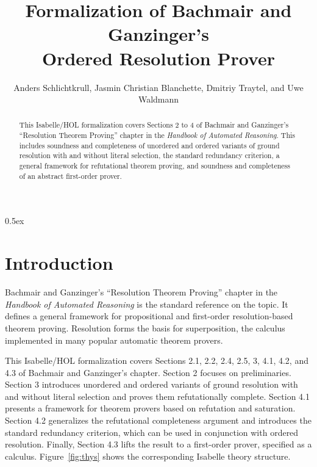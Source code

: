\documentclass[10pt,a4paper]{article}
\begin{document}
\title{Formalization of Bachmair and Ganzinger's \\ Ordered Resolution Prover}
\author{Anders Schlichtkrull, Jasmin Christian Blanchette, Dmitriy Traytel, and Uwe Waldmann}

\maketitle

\begin{abstract}
\noindent
This Isabelle/HOL formalization covers Sections 2 to 4 of Bachmair and
Ganzinger's ``Resolution Theorem Proving'' chapter in the \emph{Handbook of
Automated Reasoning}. This includes soundness and completeness of unordered
and ordered variants of ground resolution with and without literal selection,
the standard redundancy criterion, a general framework for refutational
theorem proving, and soundness and completeness of an abstract first-order
prover.
\end{abstract}

\tableofcontents

\parindent 0pt
\parskip 0.5ex

\section{Introduction}

Bachmair and Ganzinger's ``Resolution Theorem Proving'' chapter
in the \emph{Handbook of Automated Reasoning} is the standard reference on the
topic. It defines a general framework for propositional and first-order
resolution-based theorem proving. Resolution forms the basis for
superposition, the calculus implemented in many popular automatic theorem
provers.

\medskip

This Isabelle/HOL formalization covers Sections 2.1, 2.2, 2.4, 2.5, 3, 4.1,
4.2, and 4.3 of Bachmair and Ganzinger's chapter. Section 2 focuses on
preliminaries. Section 3 introduces unordered and ordered variants of ground
resolution with and without literal selection and proves them refutationally
complete. Section 4.1 presents a framework for theorem provers based on
refutation and saturation. Section 4.2 generalizes the refutational
completeness argument and introduces the standard redundancy criterion, which
can be used in conjunction with ordered resolution. Finally, Section 4.3 lifts
the result to a first-order prover, specified as a calculus.
Figure~\ref{fig:thys} shows the corresponding Isabelle theory structure.
\end{document}
